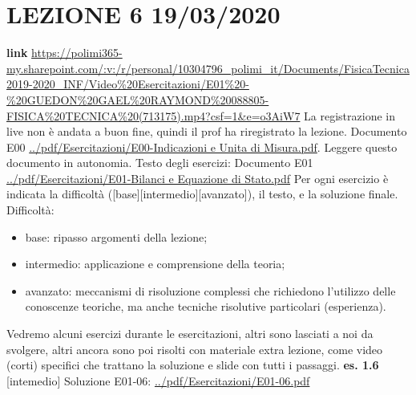\section*{LEZIONE 6 19/03/2020}
\textbf{link} \url{https://polimi365-my.sharepoint.com/:v:/r/personal/10304796_polimi_it/Documents/FisicaTecnica2019-2020_INF/Video%20Esercitazioni/E01%20-%20GUEDON%20GAEL%20RAYMOND%20088805-FISICA%20TECNICA%20(713175).mp4?csf=1&e=o3AiW7}\newline
La registrazione in live non è andata a buon fine, quindi il prof ha riregistrato la lezione.\newline
\newline
Documento E00 \url{../pdf/Esercitazioni/E00-Indicazioni e Unita di Misura.pdf}.\newline
Leggere questo documento in autonomia.\newline
\newline
Testo degli esercizi:\newline
Documento E01 \url{../pdf/Esercitazioni/E01-Bilanci e Equazione di Stato.pdf}\newline
Per ogni esercizio è indicata la difficoltà ([base][intermedio][avanzato]), il testo, e la soluzione finale.\newline
Difficoltà:
\begin{itemize}
    \item base: ripasso argomenti della lezione;
    \item intermedio: applicazione e comprensione della teoria;
    \item avanzato: meccanismi di risoluzione complessi che richiedono l'utilizzo delle conoscenze teoriche, ma anche tecniche risolutive particolari (esperienza).
\end{itemize}
Vedremo alcuni esercizi durante le esercitazioni, altri sono lasciati a noi da svolgere, altri ancora sono poi risolti con materiale extra lezione, come video (corti) specifici che trattano la soluzione e slide con tutti i passaggi.\newline
\newline
\textbf{es. 1.6} [intemedio]\newline
Soluzione E01-06: \url{../pdf/Esercitazioni/E01-06.pdf}